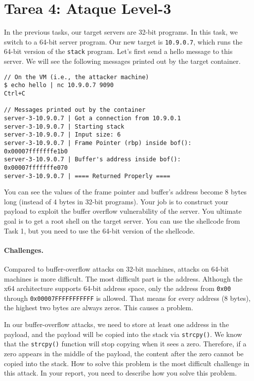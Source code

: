 \section{Tarea 4: Ataque Level-3} 

In the previous tasks, our target servers are 32-bit 
programs. In this task, we switch to a 64-bit server 
program.  Our new target is \texttt{10.9.0.7}, which 
runs the 64-bit version of the \texttt{stack} program.  
Let's first send a hello message to this server. 
We will see the following messages printed out by the target container. 

\begin{lstlisting}
// On the VM (i.e., the attacker machine)
$ echo hello | nc 10.9.0.7 9090
Ctrl+C

// Messages printed out by the container
server-3-10.9.0.7 | Got a connection from 10.9.0.1
server-3-10.9.0.7 | Starting stack
server-3-10.9.0.7 | Input size: 6
server-3-10.9.0.7 | Frame Pointer (rbp) inside bof():  0x00007fffffffe1b0
server-3-10.9.0.7 | Buffer's address inside bof():     0x00007fffffffe070
server-3-10.9.0.7 | ==== Returned Properly ====
\end{lstlisting}

You can see the values of the frame pointer and buffer's address
become 8 bytes long (instead of 4 bytes in 32-bit programs).
Your job is to construct your payload to exploit the buffer overflow
vulnerability of the server. 
You ultimate goal is to get a root shell on 
the target server. You can use the shellcode from Task 1, but 
you need to use the 64-bit version of the shellcode. 


\paragraph{Challenges.} Compared to buffer-overflow attacks on 32-bit 
machines, attacks on 64-bit machines is more difficult. The most 
difficult part is the address. Although the x64 architecture 
supports 64-bit address space, only the address from 
\texttt{0x00} through \texttt{0x00007FFFFFFFFFFF} is allowed. That means for 
every address (8 bytes), the highest two bytes are always zeros. 
This causes a problem.

In our buffer-overflow attacks, we need to store at least one address 
in the payload, and the payload will be copied into the stack via
\texttt{strcpy()}. We know that the \texttt{strcpy()} function
will stop copying when it sees a zero. Therefore, if a zero 
appears in the middle of the payload, the content after the 
zero cannot be copied into the stack. How to solve this 
problem is the most difficult challenge in this attack. In your 
report, you need to describe how you solve this problem. 




